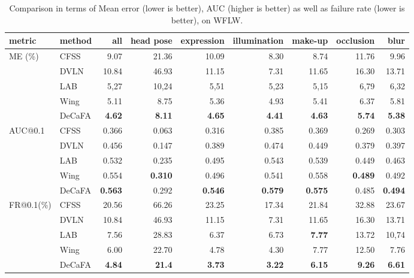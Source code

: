 \documentclass[10pt,twocolumn,letterpaper]{article}
\begin{document}
\begin{table*}[ht]
	\caption{Comparison in terms of Mean error (lower is better), AUC (higher is better) as well as failure rate (lower is better), on WFLW.}
	\label{ablation4}
	\begin{tabular}{l|l|r|r|r|r|r|r|r}
		\hline
		metric&method&	all	&head pose&	expression&	illumination&	make-up	&occlusion&	blur\\
		\hline
		ME (\%)&CFSS \cite{zhu2015face} & 9.07 & 21.36 & 10.09 & 8.30 & 8.74 & 11.76 & 9.96 \\
		&DVLN \cite{wu2017leveraging}&10.84&46.93&11.15&7.31&11.65&16.30&13.71\\
		&LAB \cite{wu2018look}	&	5,27&	10,24&	5,51&	5,23&	5,15&	6,79&	6,32\\
		&Wing \cite{feng2018wing} & 5.11 & 8.75 & 5.36 & 4.93 & 5.41 & 6.37 & 5.81\\
		\hline
		&DeCaFA&	\textbf{4.62}&	\textbf{8.11}&	\textbf{4.65}&	\textbf{4.41}&	\textbf{4.63}&	\textbf{5.74}&	\textbf{5.38}\\
		\hline
		AUC@0.1&CFSS \cite{zhu2015face} & 0.366 & 0.063 & 0.316 & 0.385 & 0.369 & 0.269 & 0.303 \\
		&DVLN \cite{wu2017leveraging} &0.456&0.147&0.389&0.474&0.449&0.379&0.397\\
		&LAB \cite{wu2018look}	&	0.532&	0.235& 0.495&	0.543&	0.539&	0.449&	0.463\\
		&Wing \cite{feng2018wing} & 0.554 & \textbf{0.310} & 0.496 & 0.541 & 0.558 & \textbf{0.489} & 0.492\\
		\hline
		&DeCaFA&	\textbf{0.563}&	0.292&	\textbf{0.546}&	\textbf{0.579}&	\textbf{0.575}&	0.485&	\textbf{0.494}\\
		\hline
		FR@0.1(\%)&CFSS \cite{zhu2015face} & 20.56 & 66.26 & 23.25 & 17.34 & 21.84 & 32.88 & 23.67 \\
		&DVLN \cite{wu2017leveraging}&10.84&46.93&11.15&7.31&11.65&16.30&13.71\\
		&LAB \cite{wu2018look}	&	7.56&	28.83&	6.37&	6.73&	\textbf{7.77}&	13.72&	10,74\\
		&Wing \cite{feng2018wing} & 6.00 & 22.70 & 4.78 & 4.30 & 7.77 & 12.50 & 7.76\\
		\hline
		&DeCaFA&	\textbf{4.84}&	\textbf{21.4}&	\textbf{3.73}&	\textbf{3.22}&	\textbf{6.15}&	\textbf{9.26}&	\textbf{6.61}\\
		\hline
	\end{tabular}
\end{table*}
\end{document}

